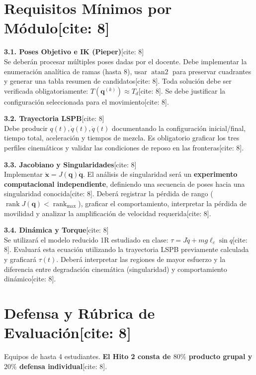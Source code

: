 \documentclass[11pt, a4paper]{article}
\begin{document}
\section{Requisitos Mínimos por Módulo[cite: 8]}

\textbf{3.1. Poses Objetivo e IK (Pieper)}[cite: 8] \\
Se deberán procesar múltiples poses dadas por el docente. Debe implementar la enumeración analítica de ramas (hasta 8), usar $\operatorname{atan2}$ para preservar cuadrantes y generar una tabla resumen de candidatos[cite: 8]. Toda solución debe ser verificada obligatoriamente: $\boxed{T(\mathbf{q}^{(k)}) \approx T_d}$[cite: 8]. Se debe justificar la configuración seleccionada para el movimiento[cite: 8].

\textbf{3.2. Trayectoria LSPB}[cite: 8] \\
Debe producir $q(t), \dot{q}(t), \ddot{q}(t)$ documentando la configuración inicial/final, tiempo total, aceleración y tiempos de mezcla. Es obligatorio graficar los tres perfiles cinemáticos y validar las condiciones de reposo en las fronteras[cite: 8].

\textbf{3.3. Jacobiano y Singularidades}[cite: 8] \\
Implementar $\dot{\mathbf{x}} = J(\mathbf{q})\dot{\mathbf{q}}$. El análisis de singularidad será un \textbf{experimento computacional independiente}, definiendo una secuencia de poses hacia una singularidad conocida[cite: 8]. Deberá registrar la pérdida de rango ($\operatorname{rank}J(\mathbf{q}) < \operatorname{rank}_{\max}$), graficar el comportamiento, interpretar la pérdida de movilidad y analizar la amplificación de velocidad requerida[cite: 8].

\textbf{3.4. Dinámica y Torque}[cite: 8] \\
Se utilizará el modelo reducido 1R estudiado en clase: $\tau = J\ddot{q} + mg\ell_c\sin q$[cite: 8]. Evaluará esta ecuación utilizando la trayectoria LSPB previamente calculada y graficará $\tau(t)$. Deberá interpretar las regiones de mayor esfuerzo y la diferencia entre degradación cinemática (singularidad) y comportamiento dinámico[cite: 8].

\section{Defensa y Rúbrica de Evaluación[cite: 8]}
Equipos de hasta 4 estudiantes. \textbf{El Hito 2 consta de $80\%$ producto grupal y $20\%$ defensa individual}[cite: 8].
\end{document}
